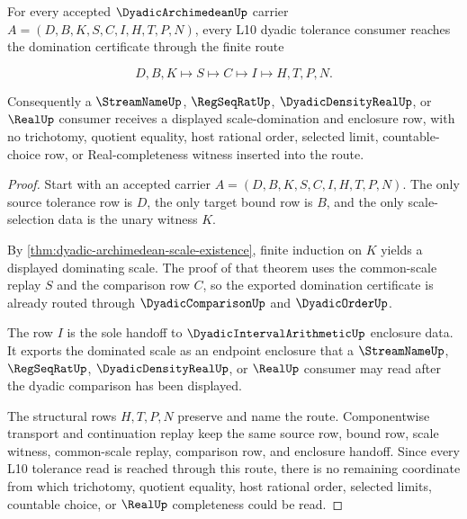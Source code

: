 \begin{theorem}
\label{thm:dyadic-archimedean-l10-handoff}
For every accepted $\DyadicArchimedeanUp$ carrier $A=(D,B,K,S,C,I,H,T,P,N)$, every L10 dyadic tolerance consumer reaches the domination certificate through the finite route

$$
D,B,K \longmapsto S \longmapsto C \longmapsto I \longmapsto H,T,P,N .
$$

Consequently a $\StreamNameUp$, $\RegSeqRatUp$, $\DyadicDensityRealUp$, or $\RealUp$ consumer receives a displayed scale-domination and enclosure row, with no trichotomy, quotient equality, host rational order, selected limit, countable-choice row, or Real-completeness witness inserted into the route.
\end{theorem}
\begin{proof}
Start with an accepted carrier $A=(D,B,K,S,C,I,H,T,P,N)$. The only source tolerance row is $D$, the only target bound row is $B$, and the only scale-selection data is the unary witness $K$.

By \autoref{thm:dyadic-archimedean-scale-existence}, finite induction on $K$ yields a displayed dominating scale. The proof of that theorem uses the common-scale replay $S$ and the comparison row $C$, so the exported domination certificate is already routed through $\DyadicComparisonUp$ and $\DyadicOrderUp$.

The row $I$ is the sole handoff to $\DyadicIntervalArithmeticUp$ enclosure data. It exports the dominated scale as an endpoint enclosure that a $\StreamNameUp$, $\RegSeqRatUp$, $\DyadicDensityRealUp$, or $\RealUp$ consumer may read after the dyadic comparison has been displayed.

The structural rows $H,T,P,N$ preserve and name the route. Componentwise transport and continuation replay keep the same source row, bound row, scale witness, common-scale replay, comparison row, and enclosure handoff. Since every L10 tolerance read is reached through this route, there is no remaining coordinate from which trichotomy, quotient equality, host rational order, selected limits, countable choice, or $\RealUp$ completeness could be read.
\end{proof}

